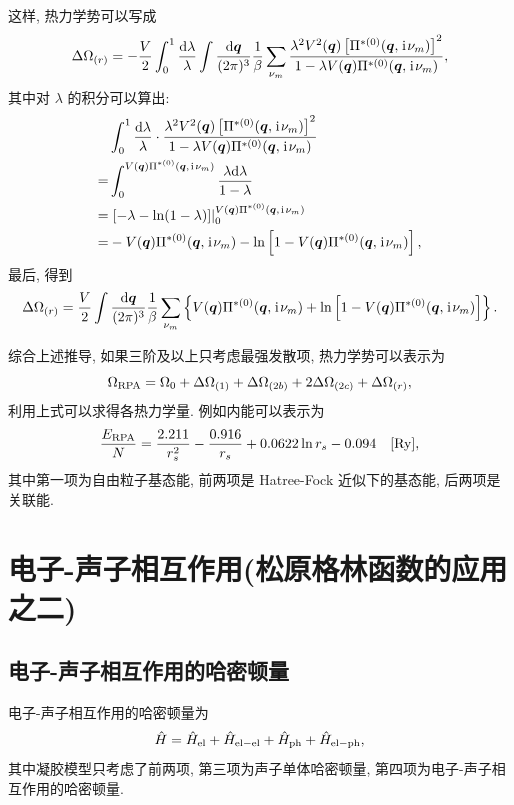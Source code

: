 这样, 热力学势可以写成 
\begin{equation}
        \Delta\Omega_{(r)}=-\frac{V}{2}\int_0^1\frac{\mathrm{d}\lambda}{\lambda}\int\frac{\mathrm{d}\boldsymbol{q}}{(2\pi)^3}\frac{1}{\beta}\sum_{\nu_m}\frac{\lambda^2 V^2(\boldsymbol{q})\left[\Pi^{*(0)}(\boldsymbol{q},\hspace{0.1em}\mathrm{i}\hspace{0.1em}\nu_m)\right]^2}{1-\lambda V(\boldsymbol{q})\Pi^{*(0)}(\boldsymbol{q},\hspace{0.1em}\mathrm{i}\hspace{0.1em}\nu_m)},
\end{equation}
其中对 $\lambda$ 的积分可以算出:
 \begin{align}
        &\int_0^1\frac{\mathrm{d}\lambda}{\lambda}\cdot\frac{\lambda^2V^2(\boldsymbol{q})\left[\Pi^{*(0)}(\boldsymbol{q},\hspace{0.1em}\mathrm{i}\hspace{0.1em}\nu_m)\right]^2}{1-\lambda V(\boldsymbol{q})\Pi^{*(0)}(\boldsymbol{q},\hspace{0.1em}\mathrm{i}\hspace{0.1em}\nu_m)}\nonumber\\
=&\int_0^{V(\boldsymbol{q})\Pi^{*(0)}(\boldsymbol{q},\hspace{0.1em}\mathrm{i}\hspace{0.1em}\nu_m)}\frac{\lambda\mathrm{d}\lambda}{1-\lambda}\nonumber\\
        =&\left.\left[- \lambda-\ln(1-\lambda) \right]\right|_0^{V(\boldsymbol{q})\Pi^{*(0)}(\boldsymbol{q},\hspace{0.1em}\mathrm{i}\hspace{0.1em}\nu_m)}\nonumber\\
        =&-V(\boldsymbol{q})\Pi^{*(0)}(\boldsymbol{q},\hspace{0.1em}\mathrm{i}\hspace{0.1em}\nu_m)-\ln\left[ 1- V(\boldsymbol{q})\Pi^{*(0)}(\boldsymbol{q},\hspace{0.1em}\mathrm{i}\hspace{0.1em}\nu_m) \right],
    \end{align}
最后, 得到 
\begin{equation}
    \Delta\Omega_{(r)}=\frac{V}{2}\int\frac{\mathrm{d}\boldsymbol{q}}{(2\pi)^3}\frac{1}{\beta}\sum_{\nu_m}\left\{ V(\boldsymbol{q})\Pi^{*(0)}(\boldsymbol{q},\hspace{0.1em}\mathrm{i}\hspace{0.1em}\nu_m)+\ln\left[ 1-V(\boldsymbol{q})\Pi^{*(0)}(\boldsymbol{q},\hspace{0.1em}\mathrm{i}\hspace{0.1em}\nu_m) \right] \right\}.
\end{equation}

综合上述推导, 如果三阶及以上只考虑最强发散项, 热力学势可以表示为 
\begin{equation}
    \Omega_{\mathrm{RPA}}=\Omega_0+\Delta\Omega_{(1)}+\Delta\Omega_{(2b)}+2\Delta\Omega_{(2c)}+\Delta\Omega_{(r)},
\end{equation}
利用上式可以求得各热力学量. 例如内能可以表示为 
\begin{equation}
    \frac{E_{\mathrm{RPA}}}{N}= \frac{2.211}{r_s^2}-\frac{0.916}{r_s}+0.0622\ln r_s-0.094 \quad \text{[Ry]},
\end{equation}
其中第一项为自由粒子基态能, 前两项是 Hatree-Fock 近似下的基态能, 后两项是关联能.

\section{电子-声子相互作用(松原格林函数的应用之二)}
\subsection{电子-声子相互作用的哈密顿量}
电子-声子相互作用的哈密顿量为 
\begin{equation}
    \hat{H}=\hat{H}_{\mathrm{el}}+\hat{H}_{\mathrm{el}-\mathrm{el}}+\hat{H}_{\mathrm{ph}}+\hat{H}_{\mathrm{el}-\mathrm{ph}},
\end{equation}
其中凝胶模型只考虑了前两项, 第三项为声子单体哈密顿量, 第四项为电子-声子相互作用的哈密顿量.

